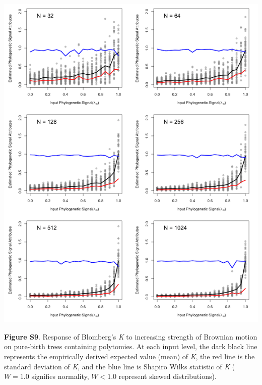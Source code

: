 \documentclass[
]{article}
\begin{document}
\includegraphics[width=0.95\linewidth]{fig.S9}

\textbf{Figure S9}. Response of Blomberg's \textit{K} to increasing
strength of Brownian motion on pure-birth trees containing polytomies.
At each input level, the dark black line represents the empirically
derived expected value (mean) of \textit{K}, the red line is the
standard deviation of \textit{K}, and the blue line is Shapiro Wilks
statistic of \textit{K} (\(W=1.0\) signifies normality, \(W< 1.0\)
represent skewed distributions).
\end{document}
